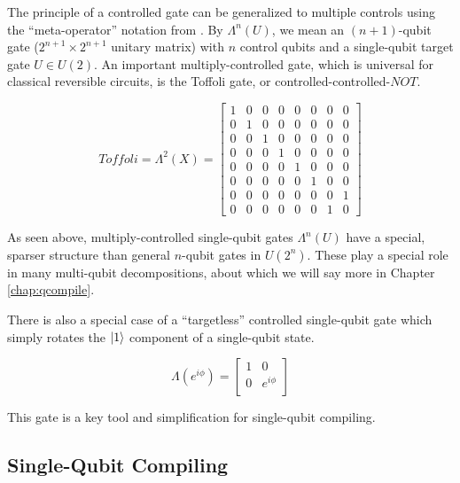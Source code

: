 The principle of a controlled gate can be generalized to multiple
controls using the ``meta-operator'' notation from \cite{Kitaev2002}.
By $\Lambda^n(U)$, we mean an $(n+1)$-qubit gate ($2^{n+1} \times 2^{n+1}$
unitary matrix) with $n$ control qubits and a single-qubit target gate
$U \in U(2)$. An important multiply-controlled gate, which is universal
for classical reversible circuits, is the Toffoli gate, or controlled-controlled-$NOT$.

\begin{equation}
Toffoli = \Lambda^2(X) = 
 \left[
  \begin{array}{cccccccc}
    1 & 0 & 0 & 0 & 0 & 0 & 0 & 0 \\
    0 & 1 & 0 & 0 & 0 & 0 & 0 & 0 \\
    0 & 0 & 1 & 0 & 0 & 0 & 0 & 0 \\
    0 & 0 & 0 & 1 & 0 & 0 & 0 & 0 \\
    0 & 0 & 0 & 0 & 1 & 0 & 0 & 0 \\
    0 & 0 & 0 & 0 & 0 & 1 & 0 & 0 \\
    0 & 0 & 0 & 0 & 0 & 0 & 0 & 1 \\
    0 & 0 & 0 & 0 & 0 & 0 & 1 & 0
  \end{array} \right]
\end{equation}

As seen above, multiply-controlled single-qubit gates $\Lambda^n(U)$ have a
special, sparser structure than general $n$-qubit gates in $U(2^n)$.
These play a special role in many multi-qubit decompositions, about which
we will say more in Chapter \ref{chap:qcompile}.

There is also a special case of a ``targetless'' controlled single-qubit
gate which simply rotates the $\left\vert{1}\right\rangle$ component of a single-qubit state.

\begin{equation}
\Lambda(e^{i\phi}) = 
 \left[
  \begin{array}{cc}
    1 & 0 \\
    0 & e^{i\phi} \\
  \end{array} \right]
\end{equation}

This gate is a key tool and simplification for single-qubit compiling.

\subsection{Single-Qubit Compiling}
\label{subsec:qcompile-single}

